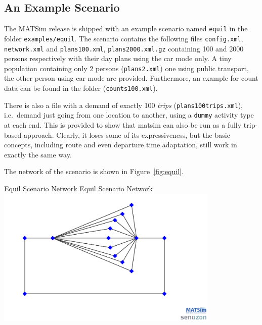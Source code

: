 \subsection{An Example Scenario}
The MATSim release is shipped with an example scenario named \lstinline|equil| in the folder \lstinline|examples/equil|. The scenario contains the following files \lstinline|config.xml|, \lstinline|network.xml| and \lstinline|plans100.xml|, \lstinline|plans2000.xml.gz| containing 100 and 2000 persons respectively with their day plans using the car mode only. A tiny population containing only 2 persons (\lstinline|plans2.xml|) one using public transport, the other person using car mode are provided. Furthermore, an example for count data can be found in the folder (\lstinline|counts100.xml|). 





There is also a file with a demand of exactly 100 \emph{trips} (\lstinline|plans100trips.xml|), i.e.\ demand just going from one location to another, using a \lstinline$dummy$ activity type at each end.  This is provided to show that \acrshort{matsim} can also be run as a fully trip-based approach.  Clearly, it loses some of its expressiveness, but the basic concepts, including route and even departure time adaptation, still work in exactly the same way.

The network of the scenario is shown in Figure~\ref{fig:equil}.

\createfigure%
{Equil Scenario Network}%
{Equil Scenario Network}%
{\label{fig:equil}}%
{\includegraphics[width=0.8\textwidth, angle=0]{using/figures/equil.png}}%
{}

